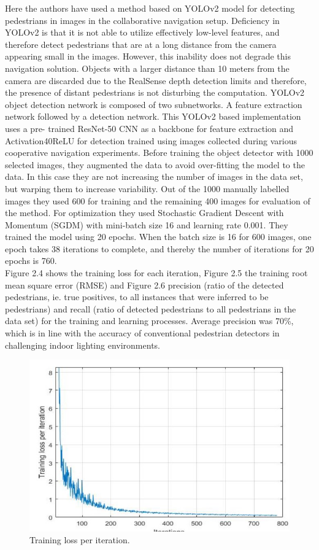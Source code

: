 Here the authors have used a method based on YOLOv2 model
for detecting pedestrians in images in the collaborative navigation setup. Deficiency in YOLOv2 is that it is not able
to utilize effectively low-level features, and therefore detect
pedestrians that are at a long distance from the camera
appearing small in the images. However, this inability does
not degrade this navigation solution. Objects with a larger
distance than 10 meters from the camera are discarded due to
the RealSense depth detection limits and therefore, the presence of distant pedestrians is not disturbing the computation.
YOLOv2 object detection network is composed of two subnetworks. A feature extraction network followed by a detection
network. This YOLOv2 based implementation uses a pre-
trained ResNet-50 CNN as a backbone for feature extraction
and Activation40ReLU for detection trained using images
collected during various cooperative navigation experiments.
Before training the object detector with 1000 selected images,
they augmented the data to avoid over-fitting the model to
the data. In this case they are not increasing the number
of images in the data set, but warping them to increase
variability. Out of the 1000 manually labelled images they used
600 for training and the remaining 400 images for evaluation of the method. For optimization they used Stochastic Gradient
Descent with Momentum (SGDM) with mini-batch size 16 and
learning rate 0.001. They trained the model using 20 epochs.
When the batch size is 16 for 600 images, one epoch takes
38 iterations to complete, and thereby the number of iterations
for 20 epochs is 760.\\
Figure 2.4 shows the training loss for each iteration, Figure 2.5
the training root mean square error (RMSE) and Figure 2.6 precision (ratio of the detected pedestrians, ie. true positives, to all
instances that were inferred to be pedestrians) and recall (ratio
of detected pedestrians to all pedestrians in the data set) for the
training and learning processes. Average precision was 70\%,
which is in line with the accuracy of conventional pedestrian
detectors in challenging indoor lighting environments.
\begin{figure}
    \centering
    \includegraphics{f4.jpg}
    \caption{Training loss per iteration.}
    
\end{figure}
